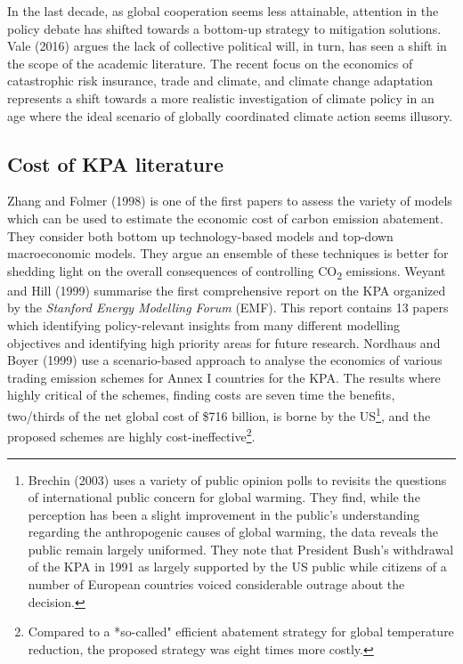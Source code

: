 \documentclass[
  10pt,
]{article}
\begin{document}
In the last decade, as global cooperation seems less attainable,
attention in the policy debate has shifted towards a bottom-up strategy
to mitigation solutions. Vale (2016) argues the lack of collective
political will, in turn, has seen a shift in the scope of the academic
literature. The recent focus on the economics of catastrophic risk
insurance, trade and climate, and climate change adaptation represents a
shift towards a more realistic investigation of climate policy in an age
where the ideal scenario of globally coordinated climate action seems
illusory.

\hypertarget{cost-of-kpa-literature}{%
\subsection{Cost of KPA literature}\label{cost-of-kpa-literature}}

Zhang and Folmer (1998) is one of the first papers to assess the variety
of models which can be used to estimate the economic cost of carbon
emission abatement. They consider both bottom up technology-based models
and top-down macroeconomic models. They argue an ensemble of these
techniques is better for shedding light on the overall consequences of
controlling CO\textsubscript{2} emissions. Weyant and Hill (1999)
summarise the first comprehensive report on the KPA organized by the
\emph{Stanford Energy Modelling Forum} (EMF). This report contains 13
papers which identifying policy-relevant insights from many different
modelling objectives and identifying high priority areas for future
research. Nordhaus and Boyer (1999) use a scenario-based approach to
analyse the economics of various trading emission schemes for Annex I
countries for the KPA. The results where highly critical of the schemes,
finding costs are seven time the benefits, two/thirds of the net global
cost of \$716 billion, is borne by the US\footnote{Brechin (2003) uses a
  variety of public opinion polls to revisits the questions of
  international public concern for global warming. They find, while the
  perception has been a slight improvement in the public's understanding
  regarding the anthropogenic causes of global warming, the data reveals
  the public remain largely uniformed. They note that President Bush's
  withdrawal of the KPA in 1991 as largely supported by the US public
  while citizens of a number of European countries voiced considerable
  outrage about the decision.}, and the proposed schemes are highly
cost-ineffective\footnote{Compared to a *so-called" efficient abatement
  strategy for global temperature reduction, the proposed strategy was
  eight times more costly.}.
\end{document}
